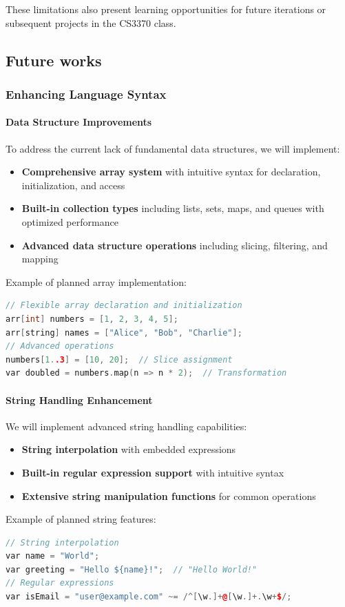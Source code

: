 \documentclass[conference]{IEEEtran}
\begin{document}
These limitations also present learning opportunities for future iterations or subsequent projects in the CS3370 class.

\subsection{Future works}
\subsubsection{Enhancing Language Syntax}
\paragraph{Data Structure Improvements}
To address the current lack of fundamental data structures, we will implement:
\begin{itemize}
\item \textbf{Comprehensive array system} with intuitive syntax for declaration, initialization, and access
\item \textbf{Built-in collection types} including lists, sets, maps, and queues with optimized performance
\item \textbf{Advanced data structure operations} including slicing, filtering, and mapping
\end{itemize}
Example of planned array implementation:
\begin{lstlisting}[language=C++, caption={Planned array implementation example}, label={lst:planned_array_impl}, basicstyle=\ttfamily\scriptsize, columns=flexible]
// Flexible array declaration and initialization
arr[int] numbers = [1, 2, 3, 4, 5];
arr[string] names = ["Alice", "Bob", "Charlie"];
// Advanced operations
numbers[1..3] = [10, 20];  // Slice assignment
var doubled = numbers.map(n => n * 2);  // Transformation
\end{lstlisting}
\paragraph{String Handling Enhancement}
We will implement advanced string handling capabilities:
\begin{itemize}
\item \textbf{String interpolation} with embedded expressions
\item \textbf{Built-in regular expression support} with intuitive syntax
\item \textbf{Extensive string manipulation functions} for common operations
\end{itemize}
Example of planned string features:
\begin{lstlisting}[language=C++, caption={Planned string features example}, label={lst:planned_string_features}, basicstyle=\ttfamily\scriptsize, columns=flexible]
// String interpolation
var name = "World";
var greeting = "Hello ${name}!";  // "Hello World!"
// Regular expressions
var isEmail = "user@example.com" ~= /^[\w.]+@[\w.]+.\w+$/;
\end{lstlisting}
\end{document}

